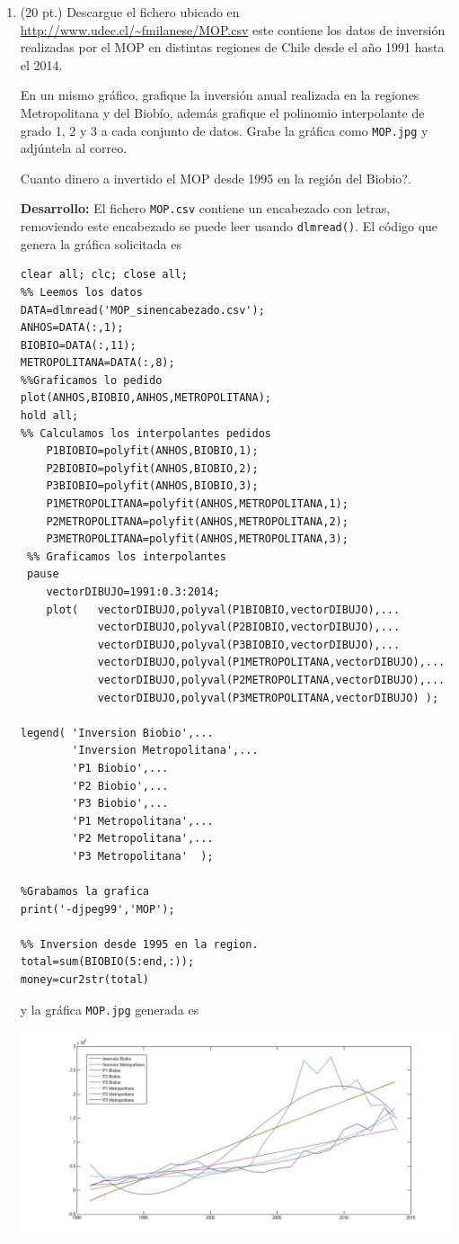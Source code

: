 \documentclass[11pt]{article}
\begin{document}
\begin{enumerate}
\newpage
\item (20 pt.) Descargue el fichero ubicado en
\url{http://www.udec.cl/~fmilanese/MOP.csv}
este contiene los datos de inversi\'on realizadas por el MOP en distintas regiones de Chile desde el año 1991 hasta el 2014. 

En un mismo gr\'afico, grafique la inversi\'on anual realizada en la regiones Metropolitana y del Biob\'io, adem\'as grafique el polinomio interpolante de grado 1, 2 y 3 a cada conjunto de datos. Grabe la gr\'afica como \texttt{MOP.jpg} y adj\'untela al correo.

\textquestiondown Cuanto dinero a invertido el MOP desde 1995 en la regi\'on del Biobio?.

\textbf{Desarrollo:} El fichero \texttt{MOP.csv} contiene un encabezado con letras, removiendo este encabezado se puede leer usando \texttt{dlmread()}. El c\'odigo que genera la gr\'afica solicitada es

\begin{lstlisting}
clear all; clc; close all;
%% Leemos los datos
DATA=dlmread('MOP_sinencabezado.csv');
ANHOS=DATA(:,1);
BIOBIO=DATA(:,11);
METROPOLITANA=DATA(:,8);
%%Graficamos lo pedido
plot(ANHOS,BIOBIO,ANHOS,METROPOLITANA);
hold all;
%% Calculamos los interpolantes pedidos
    P1BIOBIO=polyfit(ANHOS,BIOBIO,1);
    P2BIOBIO=polyfit(ANHOS,BIOBIO,2);
    P3BIOBIO=polyfit(ANHOS,BIOBIO,3);
    P1METROPOLITANA=polyfit(ANHOS,METROPOLITANA,1);
    P2METROPOLITANA=polyfit(ANHOS,METROPOLITANA,2);
    P3METROPOLITANA=polyfit(ANHOS,METROPOLITANA,3);
 %% Graficamos los interpolantes
 pause
    vectorDIBUJO=1991:0.3:2014;
    plot(   vectorDIBUJO,polyval(P1BIOBIO,vectorDIBUJO),...
            vectorDIBUJO,polyval(P2BIOBIO,vectorDIBUJO),...
            vectorDIBUJO,polyval(P3BIOBIO,vectorDIBUJO),...
            vectorDIBUJO,polyval(P1METROPOLITANA,vectorDIBUJO),...
            vectorDIBUJO,polyval(P2METROPOLITANA,vectorDIBUJO),...
            vectorDIBUJO,polyval(P3METROPOLITANA,vectorDIBUJO) );

legend( 'Inversion Biobio',...
        'Inversion Metropolitana',...
        'P1 Biobio',...
        'P2 Biobio',...
        'P3 Biobio',...
        'P1 Metropolitana',...
        'P2 Metropolitana',...
        'P3 Metropolitana'  );
        
%Grabamos la grafica
print('-djpeg99','MOP');

%% Inversion desde 1995 en la region.
total=sum(BIOBIO(5:end,:));
money=cur2str(total)
\end{lstlisting}

y la gr\'afica \texttt{MOP.jpg} generada es

\includegraphics[width=\textwidth]{MOP2.jpg}


\end{enumerate}
\end{document}
